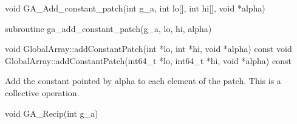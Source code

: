\documentclass[12pt]{article}
\begin{document}
\begin{capi}
\begin{ccode}
void GA_Add_constant_patch(int g_a, int lo[], int hi[], void *alpha)
\end{ccode}
\begin{funcargs}
\end{funcargs}
\end{capi}

\begin{fapi}
\begin{fcode}
subroutine ga_add_constant_patch(g_a, lo, hi, alpha)
\end{fcode}
\begin{funcargs}
\end{funcargs}
\end{fapi}

\begin{cxxapi}
\begin{cxxcode}
void GlobalArray::addConstantPatch(int *lo, int *hi, void *alpha) const
void GlobalArray::addConstantPatch(int64_t *lo, int64_t *hi, void *alpha) const
\end{cxxcode}
\begin{funcargs}
\end{funcargs}
\end{cxxapi}




\begin{desc}

Add the constant pointed by alpha to each element of the patch.
This is a collective operation.
\end{desc}


\begin{capi}
\begin{ccode}
void GA_Recip(int g_a)
\end{ccode}
\begin{funcargs}
\end{funcargs}
\end{capi}
\end{document}
